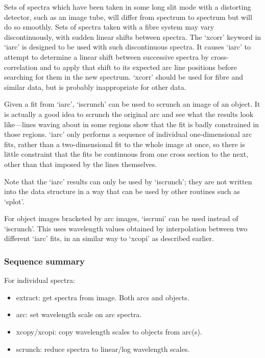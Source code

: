 \documentclass[11pt,twoside]{article}
\newcommand{\latorhtm}[2]{#1}
\newcommand{\latorhtm}[2]{#2}
\begin{document}
   Sets of spectra which have been taken in some long slit mode with a
   distorting detector, such as an image tube, will differ from spectrum
   to spectrum but will do so smoothly.  Sets of spectra taken with a
   fibre system may vary discontinuously, with sudden linear shifts
   between spectra.  The `xcorr' keyword in `iarc' is designed to be
   used with such discontinuous spectra.  It causes `iarc' to attempt to
   determine a linear shift between successive spectra by
   cross-correlation and to apply that shift to its expected arc line
   positions before searching for them in the new spectrum. `xcorr'
   should be used for fibre and similar data, but is probably
   inappropriate for other data.

   Given a fit from `iarc', `iscrunch' can be used to scrunch an image
   of an object. It is actually a good idea to scrunch the original arc
   and see what the results look like\latorhtm{---}{-}lines waving about in
   some regions show that the fit is badly constrained in those regions.
   `iarc' only performs a sequence of individual one-dimensional arc
   fits, rather than a two-dimensional fit to the whole image at once,
   so there is little constraint that the fits be continuous from one
   cross section to the next, other than that imposed by the lines
   themselves.

   Note that the `iarc' results can only be used by `iscrunch'; they are
   not written into the data structure in a way that can be used by
   other routines such as `splot'.

   For object images bracketed by arc images, `iscruni' can be used
   instead of `iscrunch'.  This uses wavelength values obtained by
   interpolation between two different `iarc' fits, in an similar way to
   `xcopi' as described earlier.


\subsubsection{\label{techno8summary}Sequence summary}

   For individual spectra:

\begin{itemize}
\item
   extract:       get spectra from image.  Both arcs and objects.
\item
   arc:           set wavelength scale on arc spectra.
\item
   xcopy/xcopi:   copy wavelength scales to objects from arc(s).
\item
   scrunch:       reduce spectra to linear/log wavelength scales.
\end{itemize}
\end{document}

